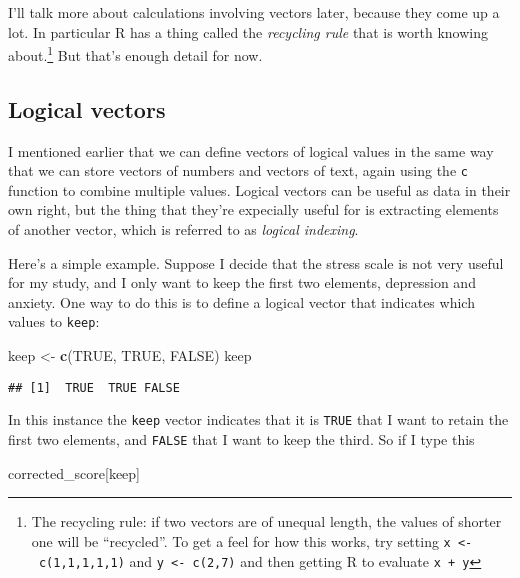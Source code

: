 \documentclass[]{book}
\newenvironment{Shaded}{\begin{snugshade}}{\end{snugshade}}
\newcommand{\KeywordTok}[1]{\textcolor[rgb]{0.13,0.29,0.53}{\textbf{#1}}}
\newcommand{\NormalTok}[1]{#1}
\newcommand{\OtherTok}[1]{\textcolor[rgb]{0.56,0.35,0.01}{#1}}
\newcommand{\StringTok}[1]{\textcolor[rgb]{0.31,0.60,0.02}{#1}}
\let\rmarkdownfootnote\footnote%
\def\footnote{\protect\rmarkdownfootnote}
\begin{document}
I'll talk more about calculations involving vectors later, because they come up a lot. In particular R has a thing called the \emph{recycling rule} that is worth knowing about.\footnote{The recycling rule: if two vectors are of unequal length, the values of shorter one will be ``recycled''. To get a feel for how this works, try setting \texttt{x\ \textless{}-\ c(1,1,1,1,1)} and \texttt{y\ \textless{}-\ c(2,7)} and then getting R to evaluate \texttt{x\ +\ y}} But that's enough detail for now.

\hypertarget{logical-vectors}{%
\subsection{Logical vectors}\label{logical-vectors}}

I mentioned earlier that we can define vectors of logical values in the same way that we can store vectors of numbers and vectors of text, again using the \texttt{c} function to combine multiple values. Logical vectors can be useful as data in their own right, but the thing that they're expecially useful for is extracting elements of another vector, which is referred to as \emph{logical indexing}.

Here's a simple example. Suppose I decide that the stress scale is not very useful for my study, and I only want to keep the first two elements, depression and anxiety. One way to do this is to define a logical vector that indicates which values to \texttt{keep}:

\begin{Shaded}
\begin{Highlighting}[]
\NormalTok{keep <-}\StringTok{ }\KeywordTok{c}\NormalTok{(}\OtherTok{TRUE}\NormalTok{, }\OtherTok{TRUE}\NormalTok{, }\OtherTok{FALSE}\NormalTok{) }
\NormalTok{keep}
\end{Highlighting}
\end{Shaded}

\begin{verbatim}
## [1]  TRUE  TRUE FALSE
\end{verbatim}

In this instance the \texttt{keep} vector indicates that it is \texttt{TRUE} that I want to retain the first two elements, and \texttt{FALSE} that I want to keep the third. So if I type this

\begin{Shaded}
\begin{Highlighting}[]
\NormalTok{corrected_score[keep]}
\end{Highlighting}
\end{Shaded}
\end{document}
